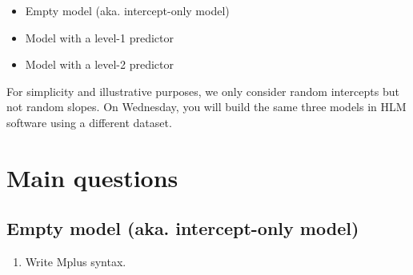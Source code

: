 \documentclass[
]{book}
\providecommand{\tightlist}{%
  \setlength{\itemsep}{0pt}\setlength{\parskip}{0pt}}
\begin{document}
\begin{itemize}
\tightlist
\item
  Empty model (aka. intercept-only model)
\item
  Model with a level-1 predictor
\item
  Model with a level-2 predictor
\end{itemize}

For simplicity and illustrative purposes, we only consider random intercepts but not random slopes. On Wednesday, you will build the same three models in HLM software using a different dataset.

\section{Main questions}\label{main-questions-3}

\subsection{Empty model (aka. intercept-only model)}\label{empty-model-aka.-intercept-only-model}

\begin{enumerate}
\def\labelenumi{\arabic{enumi}.}
\tightlist
\item
  Write Mplus syntax.
\end{enumerate}
\end{document}
